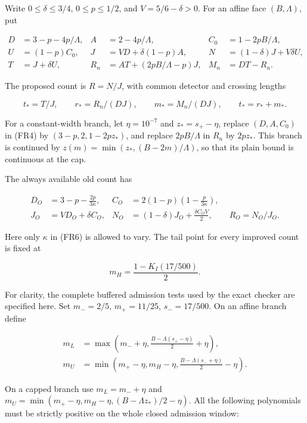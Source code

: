 Write \(0\le\delta\le3/4\), \(0\le p\le1/2\), and \(V=5/6-\delta>0\). For an affine face \((B,\Lambda)\), put

\[
\begin{aligned}
D&=3-p-4p/\Lambda,& A&=2-4p/\Lambda,& C_0&=1-2pB/\Lambda,\\
U&=(1-p)C_0,&J&=VD+\delta(1-p)A,&
N&=(1-\delta)J+V\delta U,\\
T&=J+\delta U,& R_n&=AT+(2pB/\Lambda-p)J,& M_n&=DT-R_n.
\end{aligned}
\tag{FR4}
\]

The proposed count is \(R=N/J\), with common detector and crossing lengths

\[
t_*=T/J,\qquad r_*=R_n/(DJ),\qquad m_*=M_n/(DJ),
\qquad t_*=r_*+m_*.
\tag{FR5}
\]

For a constant-width branch, let \(\eta=10^{-7}\) and \(z_*=s_+-\eta\), replace \((D,A,C_0)\) in (FR4) by \((3-p,2,1-2pz_*)\), and replace \(2pB/\Lambda\) in \(R_n\) by \(2pz_*\). This branch is continued by \(z(m)=\min(z_*,(B-2m)/\Lambda)\), so that its plain bound is continuous at the cap.

The always available old count has

\[
\begin{aligned}
D_O&=3-p-\frac{2p}{3\kappa},&
C_O&=2(1-p)\left(1-\frac{p}{3\kappa}\right),\\
J_O&=VD_O+\delta C_O,&
N_O&=(1-\delta)J_O+\frac{\delta C_OV}{2},
\qquad R_O=N_O/J_O.
\end{aligned}
\tag{FR6}
\]

Here only \(\kappa\) in (FR6) is allowed to vary. The tail point for every improved count is fixed at

\[
m_H=\frac{1-K_I(17/500)}2.
\tag{FR7}
\]

For clarity, the complete buffered admission tests used by the exact checker are specified here. Set \(m_-=2/5\), \(m_+=11/25\), \(s_-=17/500\). On an affine branch define

\[
\begin{aligned}
m_L&=\max\left(m_-+\eta,
 \frac{B-\Lambda(s_+-\eta)}2+\eta\right),\\
m_U&=\min\left(m_+-\eta,m_H-\eta,
 \frac{B-\Lambda(s_-+\eta)}2-\eta\right).
\end{aligned}
\]

On a capped branch use \(m_L=m_-+\eta\) and \(m_U=\min(m_+-\eta,m_H-\eta,(B-\Lambda z_*)/2-\eta)\). All the following polynomials must be strictly positive on the whole closed admission window:

